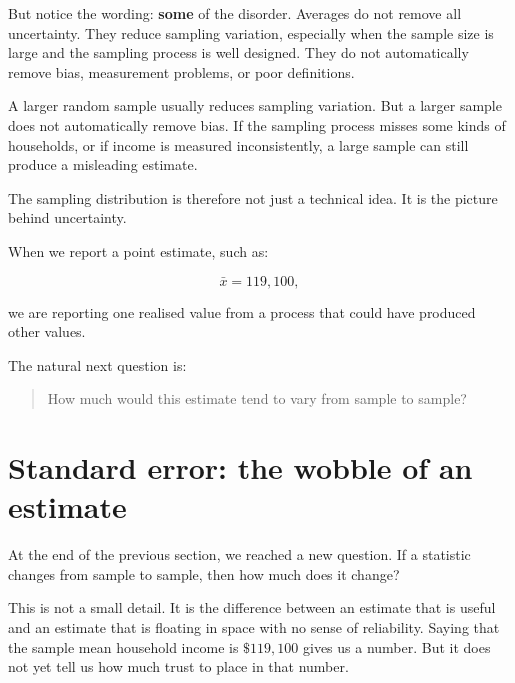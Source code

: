 \documentclass[
  letterpaper,
  DIV=11,
  numbers=noendperiod]{scrreprt}
\begin{document}
But notice the wording: \textbf{some} of the disorder. Averages do not
remove all uncertainty. They reduce sampling variation, especially when
the sample size is large and the sampling process is well designed. They
do not automatically remove bias, measurement problems, or poor
definitions.

\begin{tcolorbox}[enhanced jigsaw, arc=.35mm, bottomrule=.15mm, bottomtitle=1mm, breakable, colback=white, colbacktitle=quarto-callout-warning-color!10!white, colframe=quarto-callout-warning-color-frame, coltitle=black, left=2mm, leftrule=.75mm, opacityback=0, opacitybacktitle=0.6, rightrule=.15mm, title=\textcolor{quarto-callout-warning-color}{\faExclamationTriangle}\hspace{0.5em}{Larger samples do not fix every problem}, titlerule=0mm, toprule=.15mm, toptitle=1mm]

A larger random sample usually reduces sampling variation. But a larger
sample does not automatically remove bias. If the sampling process
misses some kinds of households, or if income is measured
inconsistently, a large sample can still produce a misleading estimate.

\end{tcolorbox}

The sampling distribution is therefore not just a technical idea. It is
the picture behind uncertainty.

When we report a point estimate, such as:

\[
\bar{x} = 119{,}100,
\]

we are reporting one realised value from a process that could have
produced other values.

The natural next question is:

\begin{quote}
How much would this estimate tend to vary from sample to sample?
\end{quote}

\section{Standard error: the wobble of an
estimate}\label{standard-error-the-wobble-of-an-estimate}

At the end of the previous section, we reached a new question. If a
statistic changes from sample to sample, then how much does it change?

This is not a small detail. It is the difference between an estimate
that is useful and an estimate that is floating in space with no sense
of reliability. Saying that the sample mean household income is
\(\$119{,}100\) gives us a number. But it does not yet tell us how much
trust to place in that number.
\end{document}
